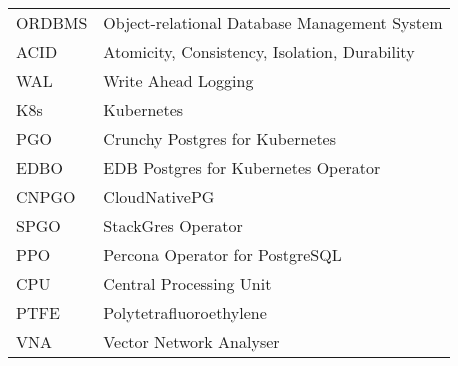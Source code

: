 
\seznamzkr

\begin{tabular}{ll}
    ORDBMS & Object-relational Database Management System  \\
    ACID   & Atomicity, Consistency, Isolation, Durability \\
    WAL    & Write Ahead Logging                           \\
    K8s    & Kubernetes                                    \\
    PGO    & Crunchy Postgres for Kubernetes               \\
    EDBO   & EDB Postgres for Kubernetes Operator          \\
    CNPGO  & CloudNativePG                                 \\
    SPGO   & StackGres Operator                            \\
    PPO    & Percona Operator for PostgreSQL               \\
    CPU    & Central Processing Unit                       \\
    PTFE   & Polytetrafluoroethylene                       \\
    VNA    & Vector Network Analyser                       \\
\end{tabular}

